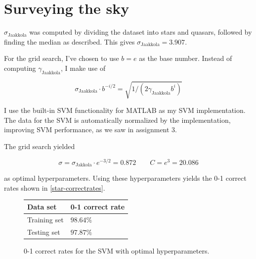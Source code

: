 \documentclass[11pt,a4paper]{article}
\begin{document}
\section{Surveying the sky}
$\sigma_{\text{Jaakkola}}$ was computed by dividing the dataset into stars
and quasars, followed by finding the median as described. This gives
$\sigma_{\text{Jaakkola}} = 3.907$.

For the grid search, I've chosen to use $b = e$ as the base number. Instead of
computing $\gamma_{\text{Jaakkola}}$, I make use of

\[
    \sigma_{\text{Jaakkola}} \cdot b^{-i/2} = \sqrt{1/(2 \gamma_{\text{Jaakkola}} b^i)}
\]

I use the built-in SVM functionality for MATLAB as my SVM implementation. The
data for the SVM is automatically normalized by the implementation, improving
SVM performance, as we saw in assignment 3.

The grid search yielded

\[ \sigma = \sigma_{\text{Jakkola}} \cdot e^{-3/2} = 0.872 \quad\quad C = e^3 = 20.086 \]

as optimal hyperparameters. Using these hyperparameters yields the 0-1 correct rates shown in
\autoref{star-correctrates}. 

\begin{figure}[h!]
    \centering
    \begin{tabular}{|l|l|}
        \hline
        Data set & 0-1 correct rate \\
        \hline
        Training set & $98.64\%$ \\
        Testing set  & $97.87\%$ \\
        \hline
    \end{tabular}
    \label{star-correctrates}
    \caption{0-1 correct rates for the SVM with optimal hyperparameters.}
\end{figure}
\end{document}
